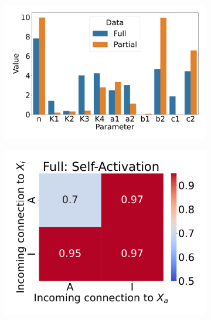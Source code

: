 \documentclass[11pt,a4paper]{article}
\begin{document}
\begin{figure}
\begin{subfigure}[c]{0.32\textwidth}
        \includegraphics[width=\textwidth]{IIII_timeshifted-parmcomp}
        \caption{}
        \label{IIII-parm}
    \end{subfigure}
    \begin{subfigure}[c]{0.28\textwidth}
        \includegraphics[width=\textwidth]{vary_cross-AA-iPSC_timeshifted-rsq-hmap}
        \caption{}
        \label{rsq-cross-a-full}
    \end{subfigure}
    \begin{subfigure}[c]{0.28\textwidth}

\end{subfigure}
\end{figure}
\end{document}
